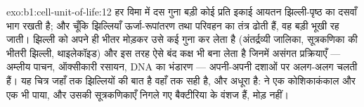 \begin{solution}{exo:b1:cell-unit-of-life:12}
हर विमा में दस गुना बड़ी कोई  प्रति इकाई आयतन झिल्ली-पृष्ठ का
दसवाँ भाग रखती है; और चूँकि झिल्लियाँ ऊर्जा-रूपांतरण तथा परिवहन का तंत्र
ढोती हैं, वह बड़ी  भूखी रह जाती।  झिल्ली को अपने ही भीतर
मोड़कर उसे कई गुना कर लेता है (अंतर्द्रव्यी जालिका, सूत्रकणिका की भीतरी
झिल्ली, थाइलेकॉइड) और इस तरह ऐसे बंद कक्ष भी बना लेता है जिनमें असंगत
प्रक्रियाएँ --- अम्लीय पाचन, ऑक्सीकारी रसायन, DNA का भंडारण --- अपनी-अपनी
दशाओं पर अलग-अलग चलती हैं। यह चित्र जहाँ तक झिल्लियों की बात है वहाँ तक
सही है, और अधूरा है:  ने एक कोशिकाकंकाल और एक  भी पाया,
और उसकी सूत्रकणिकाएँ निगले गए बैक्टीरिया के वंशज हैं, मोड़ नहीं।
\end{solution}


